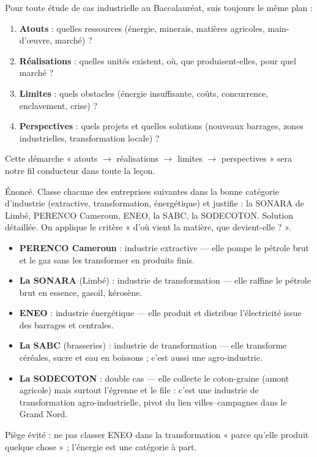 \documentclass[11pt]{article}
\newcommand{\cle}[1]{{\popxbold\color{popdark}#1}}
\begin{document}
\begin{methode}
Pour toute étude de cas industrielle au Baccalauréat, suis toujours le même plan :
\begin{enumerate}
\item \textbf{Atouts} : quelles ressources (énergie, minerais, matières agricoles, main-d'œuvre, marché) ?
\item \textbf{Réalisations} : quelles unités existent, où, que produisent-elles, pour quel marché ?
\item \textbf{Limites} : quels obstacles (énergie insuffisante, coûts, concurrence, enclavement, crise) ?
\item \textbf{Perspectives} : quels projets et quelles solutions (nouveaux barrages, zones industrielles, transformation locale) ?
\end{enumerate}
Cette démarche « atouts $\rightarrow$ réalisations $\rightarrow$ limites $\rightarrow$ perspectives » sera notre fil conducteur dans toute la leçon.
\end{methode}

\begin{exoresolu}
Énoncé. Classe chacune des entreprises suivantes dans la bonne catégorie d'industrie (extractive, transformation, énergétique) et justifie : la SONARA de Limbé, PERENCO Cameroun, ENEO, la SABC, la SODECOTON.
\tcblower
Solution détaillée. On applique le critère « d'où vient la matière, que devient-elle ? ».
\begin{itemize}
\item \textbf{PERENCO Cameroun} : industrie \cle{extractive} — elle pompe le pétrole brut et le gaz sans les transformer en produits finis.
\item \textbf{La SONARA} (Limbé) : industrie de \cle{transformation} — elle raffine le pétrole brut en essence, gasoil, kérosène.
\item \textbf{ENEO} : industrie \cle{énergétique} — elle produit et distribue l'électricité issue des barrages et centrales.
\item \textbf{La SABC} (brasseries) : industrie de \cle{transformation} — elle transforme céréales, sucre et eau en boissons ; c'est aussi une agro-industrie.
\item \textbf{La SODECOTON} : double cas — elle collecte le coton-graine (amont agricole) mais surtout l'égrenne et le file : c'est une industrie de \cle{transformation} agro-industrielle, pivot du lien villes--campagnes dans le Grand Nord.
\end{itemize}
Piège évité : ne pas classer ENEO dans la transformation « parce qu'elle produit quelque chose » ; l'énergie est une catégorie à part.
\end{exoresolu}
\end{document}
